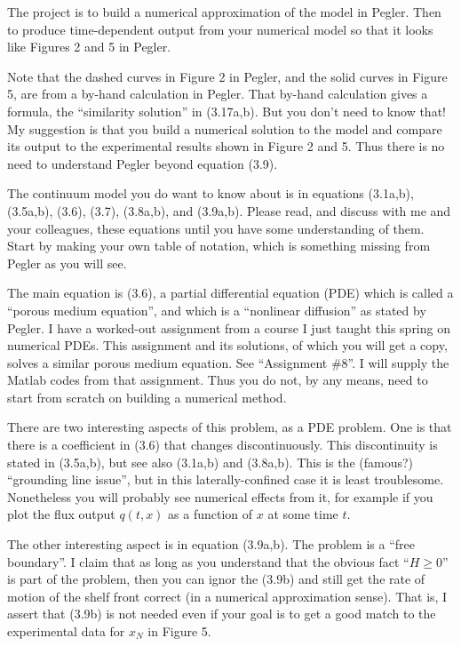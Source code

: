 \documentclass[11pt,final]{amsart}%
\begin{document}
The project is to build a numerical approximation of the model in Pegler.  Then to produce time-dependent output from your numerical model so that it looks like Figures 2 and 5 in Pegler.

Note that the dashed curves in Figure 2 in Pegler, and the solid curves in Figure 5, are from a by-hand calculation in Pegler.  That by-hand calculation gives a formula, the ``similarity solution'' in (3.17a,b).  But you don't need to know that!  My suggestion is that you build a numerical solution to the model and compare its output to the experimental results shown in Figure 2 and 5.  Thus there is no need to understand Pegler beyond equation (3.9).

The continuum model you do want to know about is in equations (3.1a,b), (3.5a,b), (3.6), (3.7), (3.8a,b), and (3.9a,b).  Please read, and discuss with me and your colleagues, these equations until you have some understanding of them.  Start by making your own table of notation, which is something missing from Pegler as you will see.

The main equation is (3.6), a partial differential equation (PDE) which is called a ``porous medium equation'', and which is a ``nonlinear diffusion'' as stated by Pegler.  I have a worked-out assignment from a course I just taught this spring on numerical PDEs.  This assignment and its solutions, of which you will get a copy, solves a similar porous medium equation.  See ``Assignment \#8''.  I will supply the Matlab codes from that assignment.  Thus you do not, by any means, need to start from scratch on building a numerical method.

There are two interesting aspects of this problem, as a PDE problem.  One is that there is a coefficient in (3.6) that changes discontinuously.  This discontinuity is stated in (3.5a,b), but see also (3.1a,b) and (3.8a,b).  This is the (famous?) ``grounding line issue'', but in this laterally-confined case it is least troublesome.  Nonetheless you will probably see numerical effects from it, for example if you plot the flux output $q(t,x)$ as a function of $x$ at some time $t$.

The other interesting aspect is in equation (3.9a,b).  The problem is a ``free boundary''.  I claim that as long as you understand that the obvious fact ``$H\ge 0$'' is part of the problem, then you can ignor the (3.9b) and still get the rate of motion of the shelf front correct (in a numerical approximation sense).  That is, I assert that (3.9b) is not needed even if your goal is to get a good match to the experimental data for $x_N$ in Figure 5.
\end{document}
